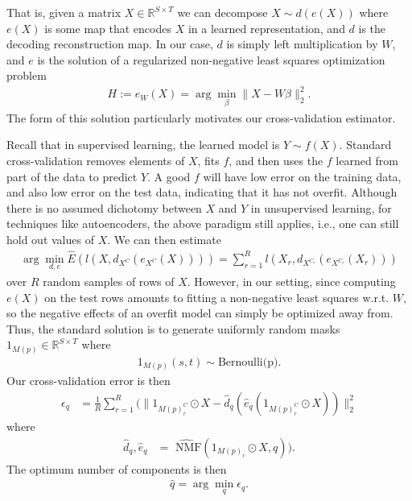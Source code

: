 \documentclass{article}
\begin{document}
That is, given a matrix $X \in \mathbb R^{S \times T}$ we can decompose $X \sim d(e(X))$ where $e(X)$ is some map that encodes $X$ in a learned representation, and $d$ is the decoding reconstruction map.
In our case, $d$ is simply left multiplication by $W$, and $e$ is the solution of a regularized non-negative least squares optimization problem
\begin{align*}
H := e_W(X) = \arg \min_{\beta} \|X - W \beta\|_2^2.
\end{align*}
The form of this solution particularly motivates our cross-validation estimator.

Recall that in supervised learning, the learned model is $Y \sim f(X)$.
Standard cross-validation removes elements of $X$, fits $f$, and then uses the $f$ learned from part of the data to predict $Y$.
A good $f$ will have low error on the training data, and also low error on the test data, indicating that it has not overfit.
Although there is no assumed dichotomy between $X$ and $Y$ in unsupervised learning, for techniques like autoencoders, the above paradigm still applies, i.e., one can still hold out values of $X$.
We can then estimate 
\begin{align*}
\arg \min_{d,e} \widehat E(l(X, d_{X^C}(e_{X^C}(X)))) = \sum_{r=  1}^R l(X_r, d_{X^{C_r}}(e_{X^{C_r}}(X_r)))
\end{align*}
over $R$ random samples of rows of $X$.
However, in our setting, since computing $e(X)$ on the test rows amounts to fitting a non-negative least squares w.r.t. $W$, so the negative effects of an overfit model can simply be optimized away from.
Thus,  the standard solution is to generate uniformly random masks $1_{M(p)} \in \mathbb R^{S \times T}$ where
\begin{align*}
1_{M(p)} (s,t) \sim \text{Bernoulli(p)}.
\end{align*}
Our cross-validation error is then
\begin{align*}
\epsilon_q &= \frac{1}{R} \sum_{r = 1}^R (\|1_{M(p)_r^C} \odot X - \widehat d_q(\widehat e_q (1_{M(p)_r^C} \odot X ))\|_2^2 
\end{align*}
where
\begin{align*}
\widehat d_q, \widehat e_q &= \widehat{\text{ NMF}}(1_{M(p)_r} \odot X, q)).
\end{align*}
The optimum number of components is then
\begin{align*}
    \widehat q = \arg \min_q \epsilon_q.
\end{align*}
\end{document}
